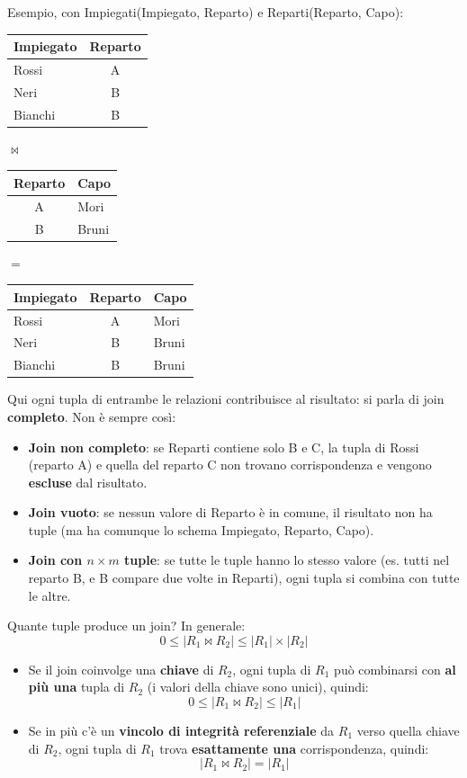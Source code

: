 \documentclass[12pt]{extarticle}
\begin{document}
\noindent Esempio, con Impiegati(Impiegato, Reparto) e Reparti(Reparto, Capo):
\begin{center}
\small
\begin{tabular}{lc}
    \toprule
    \textbf{Impiegato} & \textbf{Reparto} \\
    \midrule
    Rossi & A \\
    Neri & B \\
    Bianchi & B \\
    \bottomrule
\end{tabular}
\quad $\bowtie$ \quad
\begin{tabular}{cl}
    \toprule
    \textbf{Reparto} & \textbf{Capo} \\
    \midrule
    A & Mori \\
    B & Bruni \\
    \bottomrule
\end{tabular}
\quad $=$ \quad
\begin{tabular}{lcl}
    \toprule
    \textbf{Impiegato} & \textbf{Reparto} & \textbf{Capo} \\
    \midrule
    Rossi & A & Mori \\
    Neri & B & Bruni \\
    Bianchi & B & Bruni \\
    \bottomrule
\end{tabular}
\end{center}
Qui ogni tupla di entrambe le relazioni contribuisce al risultato: si parla di join \textbf{completo}. Non è sempre così:
\begin{itemize}
    \item \textbf{Join non completo}: se Reparti contiene solo B e C, la tupla di Rossi (reparto A) e quella del reparto C non trovano corrispondenza e vengono \textbf{escluse} dal risultato.
    \item \textbf{Join vuoto}: se nessun valore di Reparto è in comune, il risultato non ha tuple (ma ha comunque lo schema Impiegato, Reparto, Capo).
    \item \textbf{Join con $n \times m$ tuple}: se tutte le tuple hanno lo stesso valore (es. tutti nel reparto B, e B compare due volte in Reparti), ogni tupla si combina con tutte le altre.
\end{itemize}

\begin{cbox}{Quante tuple produce un join?}
\noindent In generale:
\[
0 \leq |R_1 \bowtie R_2| \leq |R_1| \times |R_2|
\]
\begin{itemize}
    \item Se il join coinvolge una \textbf{chiave} di $R_2$, ogni tupla di $R_1$ può combinarsi con \textbf{al più una} tupla di $R_2$ (i valori della chiave sono unici), quindi:
    \[
    0 \leq |R_1 \bowtie R_2| \leq |R_1|
    \]
    \item Se in più c'è un \textbf{vincolo di integrità referenziale} da $R_1$ verso quella chiave di $R_2$, ogni tupla di $R_1$ trova \textbf{esattamente una} corrispondenza, quindi:
    \[
    |R_1 \bowtie R_2| = |R_1|
    \]
\end{itemize}
\end{cbox}
\end{document}
